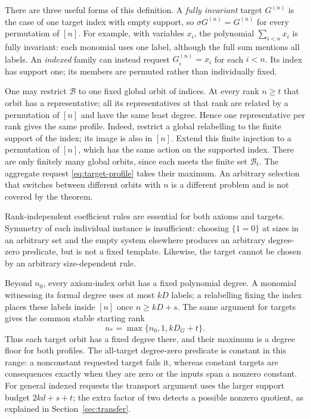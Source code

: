 There are three useful forms of this definition. A \emph{fully invariant}
target $G^{(n)}$ is the case of one target index with empty support, so
$\sigma G^{(n)}=G^{(n)}$ for every permutation of $[n]$. For example, with
variables $x_i$, the polynomial $\sum_{i<n}x_i$ is fully invariant:
each monomial uses one label, although the full sum mentions all labels.
An \emph{indexed} family can instead request $G_i^{(n)}=x_i$ for each
$i<n$. Its index has support one; its members are permuted rather than
individually fixed.

One may restrict $\mathcal B$ to one fixed global orbit of indices.
At every rank $n\ge t$ that orbit has a representative; all its
representatives at that rank are related by a permutation of $[n]$ and
have the same least degree. Hence one representative per rank gives the
same profile. Indeed, restrict a global relabelling to the finite support of the index; its image is also in $[n]$. Extend this finite injection to a permutation of $[n]$, which has the same action on the supported index. There are only finitely many global orbits, since each
meets the finite set $\mathcal B_t$. The aggregate request
\eqref{eq:target-profile} takes their maximum. An arbitrary selection
that switches between different orbits with $n$ is a different problem
and is not covered by the theorem.

Rank-independent coefficient rules are essential for both axioms and
targets. Symmetry of each individual instance is insufficient: choosing
$\{1=0\}$ at sizes in an arbitrary set and the empty system elsewhere
produces an arbitrary degree-zero predicate, but is not a fixed
template. Likewise, the target cannot be chosen by an arbitrary
size-dependent rule.

Beyond $n_0$, every axiom-index orbit has a fixed polynomial degree.
A monomial witnessing its formal degree uses at most $kD$ labels;
a relabelling fixing the index places these labels inside $[n]$ once
$n\ge kD+s$. The same argument for targets gives the common stable
starting rank
\begin{equation}\label{eq:stable-rank}
                        n_*=\max\{n_0,1,kD_G+t\}.
\end{equation}
Thus each target orbit has a fixed degree there, and their maximum is
a degree floor for both profiles. The all-target degree-zero predicate
is constant in this range: a nonconstant requested target fails it,
whereas constant targets are consequences exactly when they are zero
or the inputs span a nonzero constant. For general indexed requests the
transport argument uses the larger support budget $2kd+s+t$; the
extra factor of two detects a possible nonzero quotient, as explained
in Section~\ref{sec:transfer}.

